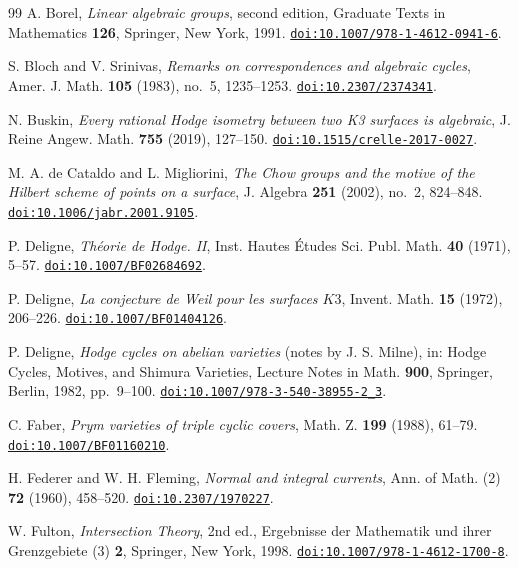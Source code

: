 \documentclass[11pt,reqno]{amsart}
\numberwithin{equation}{section}
\theoremstyle{plain}
\theoremstyle{definition}
\begin{document}
\begin{thebibliography}{99}
A. Borel,
\emph{Linear algebraic groups}, second edition,
Graduate Texts in Mathematics \textbf{126}, Springer, New York, 1991.
\href{https://doi.org/10.1007/978-1-4612-0941-6}{\nolinkurl{doi:10.1007/978-1-4612-0941-6}}.

S. Bloch and V. Srinivas,
\emph{Remarks on correspondences and algebraic cycles},
Amer. J. Math. \textbf{105} (1983), no.~5, 1235--1253.
\href{https://doi.org/10.2307/2374341}{\nolinkurl{doi:10.2307/2374341}}.

N. Buskin,
\emph{Every rational Hodge isometry between two K3 surfaces is algebraic},
J. Reine Angew. Math. \textbf{755} (2019), 127--150.
\href{https://doi.org/10.1515/crelle-2017-0027}{\nolinkurl{doi:10.1515/crelle-2017-0027}}.

M. A. de Cataldo and L. Migliorini,
\emph{The Chow groups and the motive of the Hilbert scheme of points on a
surface},
J. Algebra \textbf{251} (2002), no.~2, 824--848.
\href{https://doi.org/10.1006/jabr.2001.9105}{\nolinkurl{doi:10.1006/jabr.2001.9105}}.

P. Deligne,
\emph{Th\'eorie de Hodge. II},
Inst. Hautes \'Etudes Sci. Publ. Math. \textbf{40} (1971), 5--57.
\href{https://doi.org/10.1007/BF02684692}{\nolinkurl{doi:10.1007/BF02684692}}.

P. Deligne,
\emph{La conjecture de Weil pour les surfaces $K3$},
Invent. Math. \textbf{15} (1972), 206--226.
\href{https://doi.org/10.1007/BF01404126}{\nolinkurl{doi:10.1007/BF01404126}}.

P. Deligne,
\emph{Hodge cycles on abelian varieties} (notes by J. S. Milne),
in: Hodge Cycles, Motives, and Shimura Varieties,
Lecture Notes in Math. \textbf{900}, Springer, Berlin, 1982, pp.~9--100.
\href{https://doi.org/10.1007/978-3-540-38955-2_3}{\nolinkurl{doi:10.1007/978-3-540-38955-2_3}}.

C. Faber,
\emph{Prym varieties of triple cyclic covers},
Math. Z. \textbf{199} (1988), 61--79.
\href{https://doi.org/10.1007/BF01160210}{\nolinkurl{doi:10.1007/BF01160210}}.

H. Federer and W. H. Fleming,
\emph{Normal and integral currents},
Ann. of Math. (2) \textbf{72} (1960), 458--520.
\href{https://doi.org/10.2307/1970227}{\nolinkurl{doi:10.2307/1970227}}.

W. Fulton,
\emph{Intersection Theory}, 2nd ed.,
Ergebnisse der Mathematik und ihrer Grenzgebiete (3) \textbf{2},
Springer, New York, 1998.
\href{https://doi.org/10.1007/978-1-4612-1700-8}{\nolinkurl{doi:10.1007/978-1-4612-1700-8}}.


\end{thebibliography}
\end{document}

